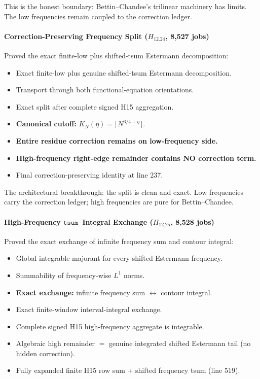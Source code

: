 \documentclass[11pt,a4paper]{article}
\theoremstyle{plain}
\theoremstyle{definition}
\theoremstyle{remark}
\begin{document}
This is the honest boundary: Bettin--Chandee's trilinear machinery has limits. The low frequencies remain coupled to the correction ledger.

\paragraph{Correction-Preserving Frequency Split ($H_{12.24}$, 8,527 jobs)}

Proved the exact finite-low plus shifted-tsum Estermann decomposition:
\begin{itemize}[leftmargin=2em]
  \item Exact finite-low plus genuine shifted-tsum Estermann decomposition.
  \item Transport through both functional-equation orientations.
  \item Exact split after complete signed H15 aggregation.
  \item \textbf{Canonical cutoff:} $K_N(\eta) = \lceil N^{3/4+\eta} \rceil$.
  \item \textbf{Entire residue correction remains on low-frequency side.}
  \item \textbf{High-frequency right-edge remainder contains NO correction term.}
  \item Final correction-preserving identity at line 237.
\end{itemize}

The architectural breakthrough: the split is clean and exact. Low frequencies carry the correction ledger; high frequencies are pure for Bettin--Chandee.

\paragraph{High-Frequency $\mathtt{tsum}$--Integral Exchange ($H_{12.25}$, 8,528 jobs)}

Proved the exact exchange of infinite frequency sum and contour integral:
\begin{itemize}[leftmargin=2em]
  \item Global integrable majorant for every shifted Estermann frequency.
  \item Summability of frequency-wise $L^1$ norms.
  \item \textbf{Exact exchange:} infinite frequency sum $\leftrightarrow$ contour integral.
  \item Exact finite-window interval-integral exchange.
  \item Complete signed H15 high-frequency aggregate is integrable.
  \item Algebraic high remainder $=$ genuine integrated shifted Estermann tail (no hidden correction).
  \item Fully expanded finite H15 row sum + shifted frequency tsum (line 519).
\end{itemize}
\end{document}
